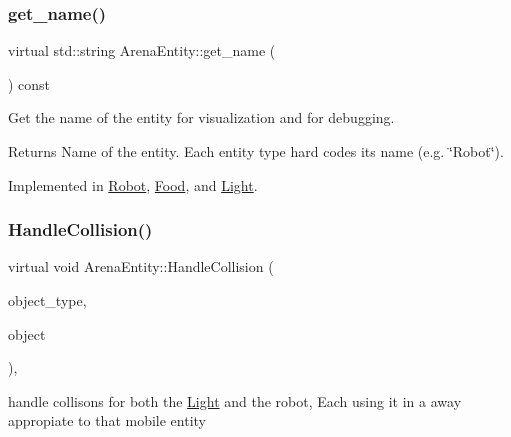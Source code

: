 \subsubsection{\texorpdfstring{get\+\_\+name()}{get\_name()}}
{\footnotesize\ttfamily virtual std\+::string Arena\+Entity\+::get\+\_\+name (\begin{DoxyParamCaption}{ }\end{DoxyParamCaption}) const\hspace{0.3cm}{\ttfamily [pure virtual]}}



Get the name of the entity for visualization and for debugging. 

\begin{DoxyReturn}{Returns}
Name of the entity. Each entity type hard codes its name (e.\+g. \char`\"{}\+Robot\char`\"{}). 
\end{DoxyReturn}


Implemented in \mbox{\hyperlink{class_robot_a3f77c13705b8f60480d21d8d936dc39e}{Robot}}, \mbox{\hyperlink{class_food_a5c3bcd5109750a15ebb24b8a2a3cdd07}{Food}}, and \mbox{\hyperlink{class_light_a49b2e32cf8173353ac4689fdadbb95d5}{Light}}.

\mbox{\label{class_arena_entity_aa9a83946e47cf824ce50325a4599eea8}} 
\subsubsection{\texorpdfstring{Handle\+Collision()}{HandleCollision()}}
{\footnotesize\ttfamily virtual void Arena\+Entity\+::\+Handle\+Collision (\begin{DoxyParamCaption}\item[{\mbox{\hyperlink{common_8h_a2e3484535ee610c8e19e9859563abe48}{\+\_\+\+\_\+unused}} Entity\+Type}]{object\+\_\+type,  }\item[{\mbox{\hyperlink{common_8h_a2e3484535ee610c8e19e9859563abe48}{\+\_\+\+\_\+unused}} \mbox{\hyperlink{class_arena_entity}{Arena\+Entity}} $\ast$}]{object }\end{DoxyParamCaption})\hspace{0.3cm}{\ttfamily [inline]}, {\ttfamily [virtual]}}



handle collisons for both the \mbox{\hyperlink{class_light}{Light}} and the robot, Each using it in a away appropiate to that mobile entity 


